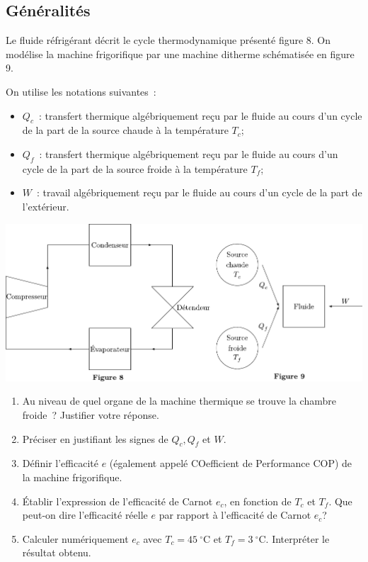 \documentclass[a4paper, 12pt, garamond]{book}
\begin{document}
\subsection{Généralités}

Le fluide réfrigérant décrit le cycle thermodynamique présenté figure 8.
On modélise la machine frigorifique par une machine ditherme schématisée
en figure 9.

On utilise les notations suivantes~:

\begin{itemize}
	\item
	      \(Q_c\)~: transfert thermique algébriquement reçu par le fluide au
	      cours d'un cycle de la part de la source chaude à la température
	      \(T_c\);
	\item
	      \(Q_f\)~: transfert thermique algébriquement reçu par le fluide au
	      cours d'un cycle de la part de la source froide à la température
	      \(T_f\);
	\item
	      \(W\)~: travail algébriquement reçu par le fluide au cours d'un cycle
	      de la part de l'extérieur.
\end{itemize}

\begin{center}

	\includegraphics[scale=1]{figures/pb-chambre-fig89.pdf}

\end{center}

\begin{enumerate}
	\item
	      Au niveau de quel organe de la machine thermique se trouve la chambre
	      froide~? Justifier votre réponse.
	\item
	      Préciser en justifiant les signes de \(Q_c,Q_f\) et \(W\).
	\item
	      Définir l'efficacité \(e\) (également appelé COefficient de
	      Performance COP) de la machine frigorifique.
	\item
	      Établir l'expression de l'efficacité de Carnot \(e_c\), en fonction de
	      \(T_c\) et \(T_f\). Que peut-on dire l'efficacité réelle \(e\) par
	      rapport à l'efficacité de Carnot \(e_c\)?
	\item
	      Calculer numériquement \(e_c\) avec \(T_c = 45\ ^\circ\mathrm{C}\) et
	      \(T_f = 3\ ^\circ\mathrm{C}\). Interpréter le résultat obtenu.
\end{enumerate}
\end{document}
